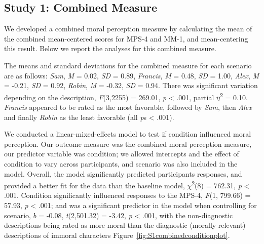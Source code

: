 \documentclass[
  man,floatsintext]{apa6}
\begin{document}
\subsection{Study 1: Combined Measure}\label{study-1-combined-measure}

We developed a combined moral perception measure by calculating the mean of the combined mean-centered scores for MPS-4 and MM-1, and mean-centering this result. Below we report the analyses for this combined measure.

The means and standard deviations for the combined measure for each scenario are as follows:
\emph{Sam},
\emph{M} = 0.02, \emph{SD} = 0.89,
\emph{Francis},
\emph{M} = 0.48, \emph{SD} = 1.00,
\emph{Alex},
\emph{M} = -0.21, \emph{SD} = 0.92,
\emph{Robin},
\emph{M} = -0.32, \emph{SD} = 0.94. There was significant variation depending on the description, \emph{F}(3,2255) = 269.01, \emph{p} \textless{} .001, partial \(\eta\)\textsuperscript{2} = 0.10. \emph{Francis} appeared to be rated as the most favorable, followed by \emph{Sam}, then \emph{Alex} and finally \emph{Robin} as the least favorable (all \emph{p}s \textless{} .001).

We conducted a linear-mixed-effects model to test if condition influenced moral perception. Our outcome measure was the combined moral perception measure, our predictor variable was condition; we allowed intercepts and the effect of condition to vary across participants, and scenario was also included in the model.
Overall, the model significantly predicted participants responses, and provided a better fit for the data than the baseline model, \(\chi\)\textsuperscript{2}(8) = 762.31, \emph{p} \textless{} .001. Condition significantly influenced responses to the MPS-4, \emph{F}(1, 799.66) = 57.93, \emph{p} \textless{} .001; and was a significant predictor in the model when controlling for scenario, \(b\) = -0.08, \emph{t}(2,501.32) = -3.42, \emph{p} \textless{} .001, with the non-diagnostic descriptions being rated as more moral than the diagnostic (morally relevant) descriptions of immoral characters Figure~\ref{fig:S1combinedconditionplot}.
\end{document}
